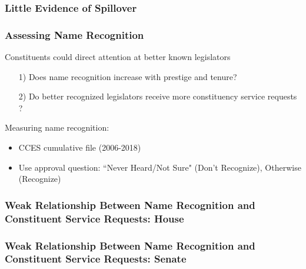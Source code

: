 \documentclass[xcolor=dvipsnames]{beamer}
\begin{document}
\begin{frame}
\frametitle{Little Evidence of Spillover}



\end{frame}


\begin{frame}
\frametitle{Assessing Name Recognition}

Constituents could direct attention at better known legislators

\begin{itemize}
	\item[1)] Does name recognition increase with prestige and tenure? 
	\item[2)] \alert{Do better recognized legislators receive more constituency service requests ?}
\end{itemize}

Measuring name recognition: 
\begin{itemize}
	\item CCES cumulative file (2006-2018)
	\item Use approval question: ``Never Heard/Not Sure" (Don't Recognize), Otherwise (Recognize)
\end{itemize}

\end{frame}


\begin{frame}
\frametitle<1>{Weak Relationship Between Name Recognition and Constituent Service Requests: House}
\frametitle<2>{Weak Relationship Between Name Recognition and Constituent Service Requests: Senate}



%

%

\end{frame}
\end{document}
